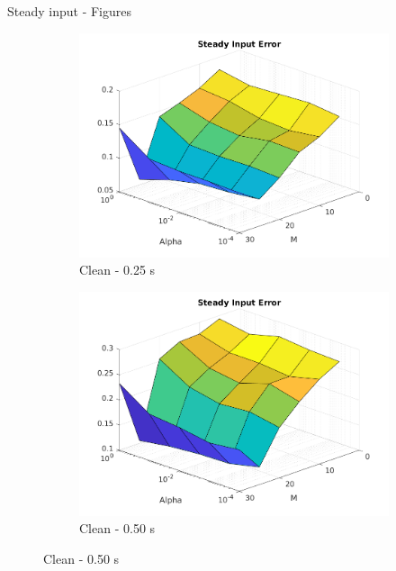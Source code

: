 \documentclass{beamer}
\begin{document}
\begin{frame}{Steady input - Figures}
    \begin{figure}
        \centering
        \begin{subfigure}[b]{0.3\textwidth}
            \centering
            \includegraphics[width=\textwidth]{Figures_Clean/figure_steady_T_0.25.png}
            \caption{Clean - 0.25 s}
            \label{fig:clean_steady_025}
        \end{subfigure}
        \hfill
        \begin{subfigure}[b]{0.3\textwidth}
            \centering
            \includegraphics[width=\textwidth]{Figures_Clean/figure_steady_T_0.50.png}
            \caption{Clean - 0.50 s}
            \label{fig:clean_steady_050}
        \end{subfigure}

\end{figure}
\end{frame}
\end{document}
